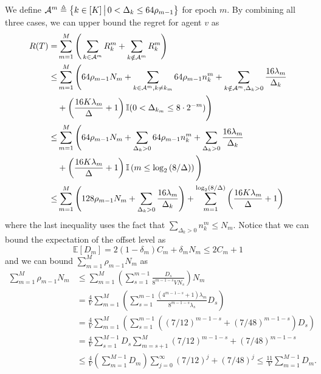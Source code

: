 We define ${\mathcal{A}}^m\triangleq\left\{ k\in[K]\,\big|\,0<\Delta_k\le 64\rho_{m-1} \right\}$ for epoch $m$. By combining all three cases, we can upper bound the regret for agent $v$ as
\begin{equation}\label{eq:cma2b-regret}
\begin{split}
R(T)=&\sum_{m=1}^M\Bigg(\sum_{k \in \mathcal{A}^m} R_k^m + \sum_{k \notin \mathcal{A}^m} R_k^m\Bigg)\\    
\le& \sum_{m=1}^M\Bigg( 64\rho_{m-1}N_m+\sum_{k \in \mathcal{A}^m,k\neq k_m} 64\rho_{m-1}n_k^m + \sum_{k \notin \mathcal{A}^m, \Delta_k>0} \frac{16\lambda_m}{\Delta_k}\\
&+ \left(\frac{16K\lambda_m}{\Delta} + 1\right){\mathbb{I}}(0<\Delta_{k_m} \le 8 \cdot 2^{-m}) \Bigg)\\ 
\le& \sum_{m=1}^M\Bigg( 64\rho_{m-1}N_m+\sum_{\Delta_k>0} 64\rho_{m-1}n_k^m + \sum_{\Delta_k>0} \frac{16\lambda_m}{\Delta_k} \\
&+ \left(\frac{16K\lambda_m}{\Delta} + 1\right){\mathbb{I}}\left(m\le \log_2\left(8/\Delta\right)\right)\Bigg)\\ 
\le& \sum_{m=1}^M\Bigg( 128\rho_{m-1}N_m + \sum_{\Delta_k>0} \frac{16\lambda_m}{\Delta_k}\Bigg) 
+ \sum_{m=1}^{\log_2(8/\Delta)}\left(\frac{16K\lambda_m}{\Delta} + 1\right)
\end{split}
\end{equation}
where the last inequality uses the fact that $\sum_{\Delta_k>0} n_k^m\le N_m$. Notice that we can bound the expectation of the offset level as
\[\mathbb{E}[D_m] = 2(1-\delta_m)C_m + \delta_m N_m \leq 2C_m + 1\]
and we can bound $\sum_{m=1}^M \rho_{m-1} N_m$ as
\begin{equation}\label{eq:cma2b-rho}
    \begin{split}
        \sum_{m=1}^M \rho_{m-1} N_m
        &\leq \sum_{m=1}^M \left(\sum_{s=1}^{m-1}\frac{D_s}{8^{m-1-s}VN_s}\right)N_m \\
        &= \frac{4}{V}\sum_{m=1}^M \left(\sum_{s=1}^{m-1}\frac{(4^{m-1-s} + 1)\lambda_m}{8^{m-1-s}\lambda_s}D_s\right) \\
        &= \frac{4}{V}\sum_{m=1}^M \left(\sum_{s=1}^{m-1}\left((7/12)^{m-1-s} + (7/48)^{m-1-s}\right)D_s\right) \\
        &= \frac{4}{V}\sum_{s=1}^{M-1} D_s \sum_{m=s+1}^M (7/12)^{m-1-s} + (7/48)^{m-1-s}\\
        &\leq \frac{4}{V}\left(\sum_{m=1}^{M-1} D_m\right)\sum_{j=0}^{\infty} \left(7/12\right)^{j} + (7/48)^{j} 
        \leq \frac{11}{V}\sum_{m=1}^{M-1} D_m.
    \end{split}
\end{equation}
